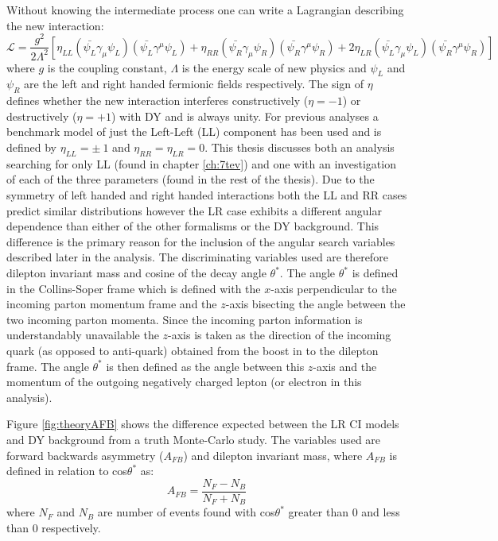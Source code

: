         Without knowing the intermediate process one can write a Lagrangian describing the new interaction:
        \begin{equation}
            \mathcal{L} = \frac{g^{2}}{2\Lambda^{2}}
                [\eta_{LL} (\bar{\psi_{L}}\gamma_{\mu}\psi_{L}) (\bar{\psi_{L}}\gamma^{\mu}\psi_{L}) 
                + \eta_{RR} (\bar{\psi_{R}}\gamma_{\mu}\psi_{R}) (\bar{\psi_{R}}\gamma^{\mu}\psi_{R}) 
                + 2\eta_{LR} (\bar{\psi_{L}}\gamma_{\mu}\psi_{L}) (\bar{\psi_{R}}\gamma^{\mu}\psi_{R}) ]
        \end{equation}
        where $g$ is the coupling constant, $\Lambda$ is the energy scale of new physics and $\psi_{L}$ and $\psi_{R}$ are the left and right handed fermionic fields respectively. The sign of $\eta$ defines whether the new interaction interferes constructively ($\eta = -1$) or destructively ($\eta = +1$) with DY and is always unity. For previous analyses \cite{PhysRevLett.103.191803,PhysRevLett.96.211801,PhysRevD.87.015010} a benchmark model of just the Left-Left (LL) component has been used and is defined by $\eta_{LL} = \pm~1$ and $\eta_{RR} = \eta_{LR} = 0$. This thesis discusses both an analysis searching for only LL (found in chapter \ref{ch:7tev}) and one with an investigation of each of the three parameters (found in the rest of the thesis). Due to the symmetry of left handed and right handed interactions both the LL and RR cases predict similar distributions however the LR case exhibits a different angular dependence than either of the other formalisms or the DY background. This difference is the primary reason for the inclusion of the angular search variables described later in the analysis. The discriminating variables used are therefore dilepton invariant mass and cosine of the decay angle $\theta^{*}$. The angle $\theta^{*}$ is defined in the Collins-Soper frame \cite{PhysRevD.16.2219} which is defined with the $x$-axis perpendicular to the incoming parton momentum frame and the $z$-axis bisecting the angle between the two incoming parton momenta. Since the incoming parton information is understandably unavailable the $z$-axis is taken as the direction of the incoming quark (as opposed to anti-quark) obtained from the boost in to the dilepton frame. The angle $\theta^{*}$ is then defined as the angle between this $z$-axis and the momentum of the outgoing negatively charged lepton (or electron in this analysis).


        Figure \ref{fig:theoryAFB} shows the difference expected between the LR CI models and DY background from a truth Monte-Carlo study. The variables used are forward backwards asymmetry ($A_{FB}$) and dilepton invariant mass, where $A_{FB}$ is defined in relation to cos$\theta^{*}$ as:
        \begin{equation}
            A_{FB} = 
                \frac{N_{F} - N_{B}}{N_{F} + N_{B}}
            \label{eq:AFB}
        \end{equation}
        where $N_{F}$ and $N_{B}$ are number of events found with cos$\theta^{*}$ greater than 0 and less than 0 respectively.
        
